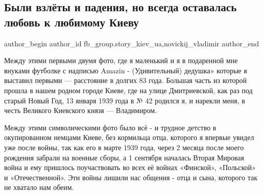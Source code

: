  
 
 
 
 
 
\subsection{Были взлёты и падения, но всегда оставалась любовь к любимому Киеву}
\label{sec:13_01_2022.fb.fb_group.story_kiev_ua.2.vzlety_i_padenia}
 
\ifcmt
 author_begin
   author_id fb_group.story_kiev_ua,novickij_vladimir
 author_end
\fi

Между этими первыми двумя фото, где я маленький и  я в подаренной мне внуками
футболке с надписью  Amazin - (Удивительный) дедушка» которые я выставил первыми
— расстояние в долгих 83 года.  Большая часть из которой прошла в нашем родном
городе Киеве, где на улице Дмитриевской, как раз под старый Новый Год, 13
января 1939 года  в № 42 родился я,  и нарекли меня, в честь Великого Киевского
князя — Владимиром. 

\raggedcolumns
\begin{multicols}{3} %
\setlength{\parindent}{0pt}




\end{multicols} %

Между этими символическими фото  было всё - и трудное детство в окупированном
немцами Киеве, без кормильца отца, которого я впервые увидел уже после войны,
так как его в марте 1939 года, через 2 месяца после моего рождения забрали на
военные сборы, а  1 сентября началась Вторая Мировая война и ему пришлось
поучаствовать  во всех её войнах «Финской», «Польской» и «Отечественной». Эти
войны лишили нас общения - отца и сына, которого так не  хватало нам обеим.

